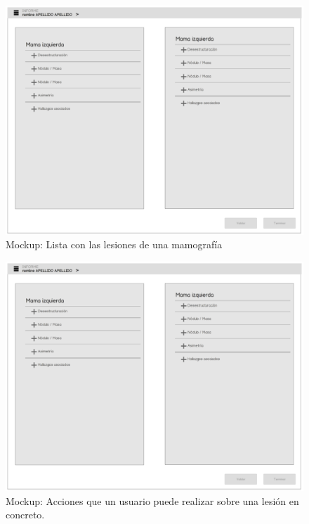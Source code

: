 \begin{figure}[ht]
\centering
\includegraphics[page=5,scale=0.4]{./imgs/mockup/mockup.pdf}
\caption{Mockup: Lista con las lesiones de una mamografía}
\label{fig:mockup:treenodes}
\end{figure}

\begin{figure}[ht]
\centering
\includegraphics[page=7,scale=0.4]{./imgs/mockup/mockup.pdf}
\caption{Mockup: Acciones que un usuario puede realizar sobre una lesión en concreto.}
\label{fig:mockup:expandable}
\end{figure}

